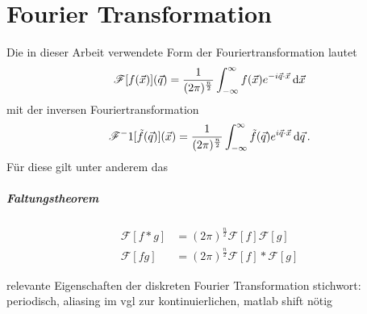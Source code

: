 \chapter{Fourier Transformation}
Die in dieser Arbeit verwendete Form der Fouriertransformation lautet
\begin{equation}
	\mathscr{F} [f(\vec{x})] (\vec{q})
	=
	\frac{1}{(2\pi)^\frac{n}{2}}
	\int_{-\infty}^{\infty}
	f(\vec{x})
	e^{-i\vec{q} \cdot \vec{x} } 
	\dif  \vec{x}
\end{equation}
mit der inversen Fouriertransformation
\begin{equation}
	\mathscr{F}^-1 [\tilde{f}(\vec{q})] (\vec{x})
	=
	\frac{1}{(2\pi)^\frac{n}{2}}
	\int_{-\infty}^{\infty}
	\tilde{f}(\vec{q})
	e^{i\vec{q} \cdot \vec{x} } 
	\dif  \vec{q} \, .
\end{equation}
Für diese gilt unter anderem das 
\paragraph{Faltungstheorem}
\begin{align}
	\mathscr{F} [f\ast g] & =(2\pi)^\frac{n}{2}\mathscr{F}[f] \mathscr{F}[g]     \\
	\mathscr{F}[fg]       & =(2\pi)^\frac{n}{2}\mathscr{F}[f]\ast \mathscr{F}[g] 
\end{align}

relevante Eigenschaften der diskreten Fourier Transformation
stichwort: periodisch, aliasing im vgl zur kontinuierlichen, matlab shift nötig
